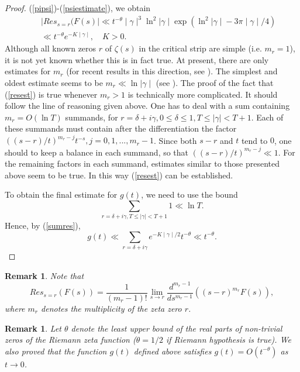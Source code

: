 \documentclass{article}
\newtheorem{remark}[theorem]{Remark}
\begin{document}
\begin{proof}
(\ref{pipsi})-(\ref{psiestimate}), we obtain
\begin{eqnarray}\label{resest}
& & \mid Res_{s=r}(F(s)\mid\ll t^{-\theta}\mid\gamma\mid^3
\ln^2{\mid\gamma\mid}
\exp{(\ln^2{\mid\gamma\mid}-3\pi\mid\gamma\mid/4)} \nonumber \\
& & \ll t^{-\theta} e^{-K\mid\gamma\mid}, \quad K>0.
\end{eqnarray}
Although all known zeros $r$ of $\zeta(s)$ in the critical strip
are simple (i.e. $m_r=1$), it is not yet known whether this is in
fact true. At present, there are only estimates for $m_r$ (for
recent results in this direction, see \cite{Ivic1999}). The simplest
and oldest estimate seems to be $m_r\ll\ln{\mid\gamma\mid}$ (see
\cite[p.\ 211]{Titchmarsh86}). The proof of the fact that (\ref{resest})
is true whenever $m_r>1$ is technically more complicated. It
should follow the line of reasoning given above. One has to deal
with a sum containing $m_r=O(\ln{T})$ summands, for
$r=\delta+i\gamma, 0\le\delta\le 1, T\le\mid\gamma\mid<T+1$. Each
of these summands must contain after the differentiation the
factor $((s-r)/t)^{m_r-j}t^{-s}, j=0,1,...,m_r-1$. Since both
$s-r$ and $t$ tend to $0$, one should to keep a balance in each
summand, so that $((s-r)/t)^{m_r-j}\ll 1$. For the remaining
factors in each summand, estimates similar to those presented
above seem to be true. In this way (\ref{resest}) can be
established.

To obtain the final estimate for $g(t)$, we need to use the bound
\cite[p.\ 211]{Titchmarsh86}
$$
\sum_{r=\delta+i\gamma, T\le\mid\gamma\mid<T+1} 1\ll\ln{T}.
$$
Hence, by (\ref{sumres}),
$$
g(t)\ll\sum_{r=\delta+i\gamma} e^{-K\mid\gamma\mid/2} t^{-\theta}
\ll t^{-\theta}.
$$

\end{proof}
\begin{remark}Note that
 \begin{equation}\label{res}
 Res_{s=r}(F(s)) =\dfrac{1}{(m_r-1)!}\lim_{s\to r}\frac{d^{m_r-1}}{ds^{m_r-1}}((s-r)^{m_r}F(s)),
 \end{equation}
 where $m_r$ denotes the multiplicity of the zeta zero $r$. 
\end{remark}

\begin{remark} Let $\theta$ denote the least upper bound of the
real parts of non-trivial zeros of the Riemann zeta function
($\theta=1/2$ if Riemann hypothesis is true). We also proved that the function $g(t)$ defined above
satisfies $g(t)=O(t^{-\theta})$ as $t\to 0$.
\end{remark}
\end{document}
